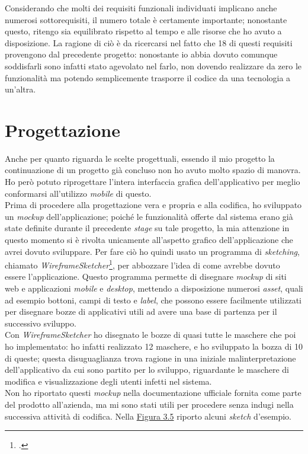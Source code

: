 Considerando che molti dei requisiti funzionali individuati implicano anche numerosi sottorequisiti, il numero totale è certamente importante; nonostante questo, ritengo sia equilibrato rispetto al tempo e alle risorse che ho avuto a disposizione. La ragione di ciò è da ricercarsi nel fatto che 18 di questi requisiti provengono dal precedente progetto: nonostante io abbia dovuto comunque soddisfarli sono infatti stato agevolato nel farlo, non dovendo realizzare da zero le funzionalità ma potendo semplicemente trasporre il codice da una tecnologia a un'altra.


\section{Progettazione}

Anche per quanto riguarda le scelte progettuali, essendo il mio progetto la continuazione di un progetto già concluso non ho avuto molto spazio di manovra. Ho però potuto riprogettare l'intera interfaccia grafica dell'applicativo per meglio conformarsi all'utilizzo \textit{mobile} di questo. \\
Prima di procedere alla progettazione vera e propria e alla codifica, ho sviluppato un \textit{mockup} dell'applicazione; poiché le funzionalità offerte dal sistema erano già state definite durante il precedente \textit{stage} su tale progetto, la mia attenzione in questo momento si è rivolta unicamente all'aspetto grafico dell'applicazione che avrei dovuto sviluppare. Per fare ciò ho quindi usato un programma di \textit{sketching}, chiamato \textit{WireframeSketcher}\footcite{tec:wireframesketcher}, per abbozzare l'idea di come avrebbe dovuto essere l'applicazione. Questo programma permette di disegnare \textit{mockup} di siti web e applicazioni \textit{mobile} e \textit{desktop}, mettendo a disposizione numerosi \textit{asset}, quali ad esempio bottoni, campi di testo e \textit{label}, che possono essere facilmente utilizzati per disegnare bozze di applicativi utili ad avere una base di partenza per il successivo sviluppo. \\
Con \textit{WireframeSketcher} ho disegnato le bozze di quasi tutte le maschere che poi ho implementato: ho infatti realizzato 12 maschere, e ho sviluppato la bozza di 10 di queste; questa disuguaglianza trova ragione in una iniziale malinterpretazione dell'applicativo da cui sono partito per lo sviluppo, riguardante le maschere di modifica e visualizzazione degli utenti infetti nel sistema. \\
Non ho riportato questi \textit{mockup} nella documentazione ufficiale fornita come parte del prodotto all'azienda, ma mi sono stati utili per procedere senza indugi nella successiva attività di codifica. Nella \hyperref[img:appsketch]{Figura 3.5} riporto alcuni \textit{sketch} d'esempio. \\

